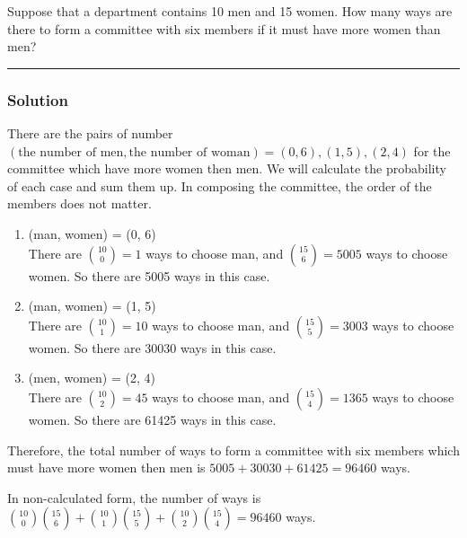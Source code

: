 \newpage
\begin{question}
Suppose that a department contains 10 men and 15 women. How many ways are there to form a committee with six members if it must have more women than men?
\end{question}

\par\noindent\rule{\textwidth}{0.5pt}

\subsubsection*{Solution}

There are the pairs of number $(\text{the number of men}, \text{the number of woman}) = (0, 6), (1, 5), (2, 4)$ for the committee which have more women then men. We will calculate the probability of each case and sum them up. In composing the committee, the order of the members does not matter.

\begin{enumerate}[label=(Case \arabic*), leftmargin=*, align=left]
    \item (man, women) = (0, 6) \\
    There are $\displaystyle\binom{10}{0} = 1$ ways to choose man, and $\displaystyle\binom{15}{6} = 5005$ ways to choose women. So there are 5005 ways in this case.
    \item (man, women) = (1, 5) \\
    There are $\displaystyle\binom{10}{1} = 10$ ways to choose man, and $\displaystyle\binom{15}{5} = 3003$ ways to choose women. So there are 30030 ways in this case.
    \item (men, women) = (2, 4) \\
    There are $\displaystyle\binom{10}{2} = 45$ ways to choose man, and $\displaystyle\binom{15}{4} = 1365$ ways to choose women. So there are 61425 ways in this case.
\end{enumerate}
Therefore, the total number of ways to form a committee with six members which must have more women then men is $5005 + 30030 + 61425 = 96460$ ways.

\bigskip\noindent
In non-calculated form, the number of ways is $\displaystyle\binom{10}{0}\displaystyle\binom{15}{6} + \displaystyle\binom{10}{1}\displaystyle\binom{15}{5} + \displaystyle\binom{10}{2}\displaystyle\binom{15}{4} = 96460$ ways.